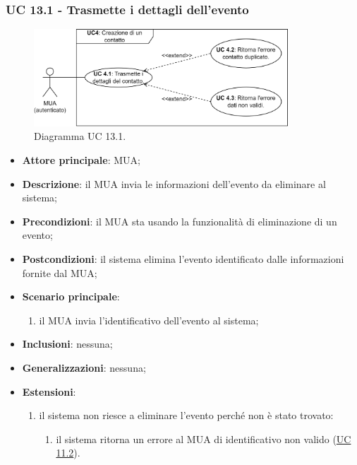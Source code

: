 \subsubsection{UC 13.1 - Trasmette i dettagli dell'evento} \label{sec:UC13.1}
    \begin{figure}[h]
        \includegraphics[width=0.85\textwidth]{sections/uc_imgs/UC04.X.png}
        \centering
        \caption{Diagramma UC 13.1.}
    \end{figure}
    \begin{itemize}
        \item \textbf{Attore principale}: MUA;
        \item \textbf{Descrizione}: il MUA invia le informazioni dell'evento da eliminare al sistema;
        \item \textbf{Precondizioni}: il MUA sta usando la funzionalità di eliminazione di un evento;
        \item \textbf{Postcondizioni}: il sistema elimina l'evento identificato dalle informazioni fornite dal MUA;
        \item \textbf{Scenario principale}:
            \begin{enumerate}
                \item il MUA invia l'identificativo dell'evento al sistema;
            \end{enumerate}
        \item \textbf{Inclusioni}: nessuna;
        \item \textbf{Generalizzazioni}: nessuna;
        \item \textbf{Estensioni}:
            \begin{enumerate}[label=\alph*.]
                \item il sistema non riesce a eliminare l'evento perché non è stato trovato:
                \begin{enumerate}[label=\arabic*.]
                    \item il sistema ritorna un errore al MUA di identificativo non valido (\hyperref[sec:UC11.2]{UC 11.2}).
                \end{enumerate}
            \end{enumerate}
    \end{itemize}


